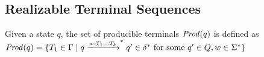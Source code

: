\subsection{Realizable Terminal Sequences}
\begin{definition}[Producible]
    \label{def:Producible}
    Given a state $q$, the set of producible terminals $\mathit{Prod}(q)$ is defined as $\mathit{Prod}(q) = \{T_1 \in \Gamma \mid q \xrightarrow{w:T_1 \ldots T_k}^\ast q' \in \delta^\ast \textrm{ for some } q'\in Q, w \in \Sigma^\ast \}$
\end{definition}


